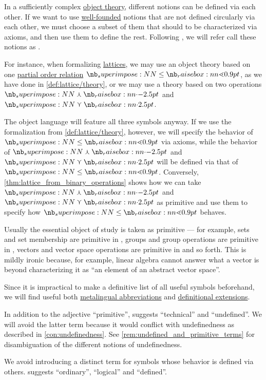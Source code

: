 \begin{concept}\label{con:primitive_notion}
  In a sufficiently complex \hyperref[con:metalogic]{object theory}, different notions can be defined via each other. If we want to use \hyperref[def:well_founded_relation]{well-founded} notions that are not defined circularly via each other, we must choose a subset of them that should to be characterized via axioms, and then use them to define the rest. Following , we will refer call these notions as .

  For instance, when formalizing \hyperref[def:lattice]{lattices}, we may use an object theory based on one \hyperref[def:partially_ordered_set]{partial order relation} \( {\synleq} \), as we have done in \cref{def:lattice/theory}, or we may use a theory based on two operations \( {\synvarwedge} \) and \( {\synvarvee} \).

  The object language will feature all three symbols anyway. If we use the formalization from \cref{def:lattice/theory}, however, we will specify the behavior of \( {\synleq} \) via axioms, while the behavior of \( {\synvarwedge} \) and \( {\synvarvee} \) will be defined via that of \( {\synleq} \). Conversely, \cref{thm:lattice_from_binary_operations} shows how we can take \( {\synvarwedge} \) and \( {\synvarvee} \) as primitive and use them to specify how \( {\synleq} \) behaves.

  Usually the essential object of study is taken as primitive --- for example, sets and set membership are primitive in , groups and group operations are primitive in , vectors and vector space operations are primitive in  and so forth. This is mildly ironic because, for example, linear algebra cannot answer what a vector is beyond characterizing it as \enquote{an element of an abstract vector space}.

  Since it is impractical to make a definitive list of all useful symbols beforehand, we will find useful both \hyperref[con:syntactic_abbreviation]{metalingual abbreviations} and \hyperref[def:hol_definitional_extension]{definitional extensions}.
\end{concept}
\begin{comments}
  \item In addition to the adjective \enquote{primitive},  suggests \enquote{technical} and \enquote{undefined}. We will avoid the latter term because it would conflict with undefinedness as described in \cref{con:undefinedness}. See \cref{rem:undefined_and_primitive_terms} for disambiguation of the different notions of undefinedness.

  \item We avoid introducing a distinct term for symbols whose behavior is defined via others.  suggests \enquote{ordinary}, \enquote{logical} and \enquote{defined}.
\end{comments}

